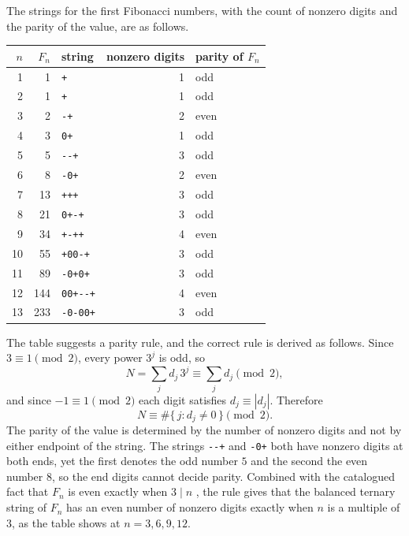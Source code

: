 \documentclass[11pt]{article}
\theoremstyle{definition}
\theoremstyle{remark}
\newcommand{\bt}[1]{\texttt{#1}}
\begin{document}
The strings for the first Fibonacci numbers, with the count of nonzero digits and the parity of the value, are as follows.
\begin{center}
\begin{tabular}{rrlrl}
$n$ & $F_n$ & string & nonzero digits & parity of $F_n$ \\
\hline
1 & 1 & \bt{+} & 1 & odd \\
2 & 1 & \bt{+} & 1 & odd \\
3 & 2 & \bt{-+} & 2 & even \\
4 & 3 & \bt{0+} & 1 & odd \\
5 & 5 & \bt{-{}-+} & 3 & odd \\
6 & 8 & \bt{-0+} & 2 & even \\
7 & 13 & \bt{+++} & 3 & odd \\
8 & 21 & \bt{0+-+} & 3 & odd \\
9 & 34 & \bt{+-++} & 4 & even \\
10 & 55 & \bt{+00-+} & 3 & odd \\
11 & 89 & \bt{-0+0+} & 3 & odd \\
12 & 144 & \bt{00+-{}-+} & 4 & even \\
13 & 233 & \bt{-0-00+} & 3 & odd \\
\end{tabular}
\end{center}
The table suggests a parity rule, and the correct rule is derived as follows. Since $3 \equiv 1 \pmod 2$, every power $3^{j}$ is odd, so
\[
N = \sum_j d_j\,3^{j} \equiv \sum_j d_j \pmod 2,
\]
and since $-1 \equiv 1 \pmod 2$ each digit satisfies $d_j \equiv |d_j|$. Therefore
\[
N \equiv \#\{\, j : d_j \ne 0 \,\} \pmod 2 .
\]
The parity of the value is determined by the number of nonzero digits and not by either endpoint of the string. The strings \bt{-{}-+} and \bt{-0+} both have nonzero digits at both ends, yet the first denotes the odd number $5$ and the second the even number $8$, so the end digits cannot decide parity. Combined with the catalogued fact that $F_n$ is even exactly when $3 \mid n$ \cite{oeis}, the rule gives that the balanced ternary string of $F_n$ has an even number of nonzero digits exactly when $n$ is a multiple of $3$, as the table shows at $n = 3, 6, 9, 12$.
\end{document}

